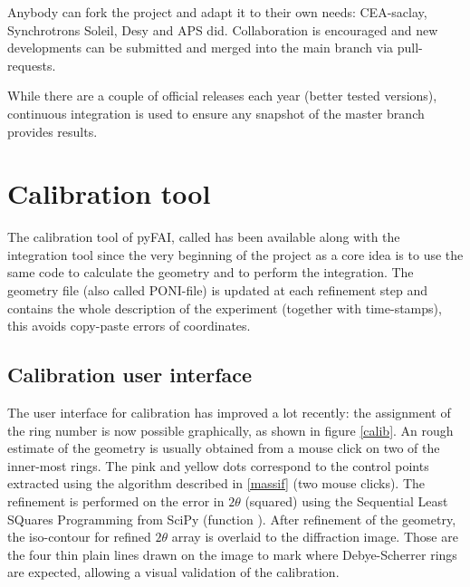 \documentclass[preprint]{iucr}
\begin{document}
Anybody can fork the project and adapt it to their own needs: CEA-saclay,
Synchrotrons Soleil, Desy and APS did. Collaboration is encouraged and 
new developments can be submitted and merged into the main branch
via pull-requests. 

While there are a couple of official releases each year (better
tested versions), continuous integration is used to ensure any snapshot of the
master branch provides  results.

\section{Calibration tool}
\label{annex_calib}

The calibration tool of pyFAI, called  has been available
along with the integration tool since the very beginning of the project as a core idea
is to use the same code to calculate the geometry and to perform the integration.
The geometry file (also called PONI-file) is updated at each refinement step and
contains the whole description of the experiment (together with time-stamps),
this avoids copy-paste errors of coordinates.

\subsection{Calibration user interface}

The user interface for calibration has improved a lot recently: the assignment
of the ring number is now possible graphically, as shown in figure \ref{calib}.
An rough estimate of the geometry is usually obtained from a mouse click on 
two of the inner-most rings. 
The pink and yellow dots correspond to the control points extracted using
the algorithm described in \ref{massif} (two mouse clicks).
The refinement is performed on the error in $2\theta$ (squared) using the 
Sequential Least SQuares Programming  from
SciPy (function ).
After refinement of the geometry, the iso-contour for refined $2\theta$ array is
overlaid to the diffraction image. Those are the four thin plain lines drawn on
the image to mark where Debye-Scherrer rings are expected, allowing a visual 
validation of the calibration.
\end{document}
